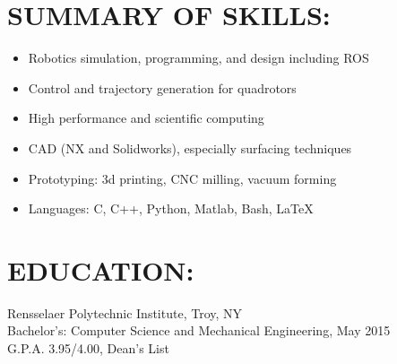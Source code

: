 \documentclass[margin]{res}
\begin{document}
  

\address{\bf Permanent\\ 3361 E. Maplewood Ave. \\   Centennial, CO 80121\\ {\bf phone: }(720) 270-3901 \\ {\bf email: }micahcorah@gmail.com}
\address{\bf Current\\ Williams 302c \\ 1999 Burdett Ave. \\   Troy, NY 12180  }

\begin{resume}                        
\vspace{-1.5mm}
\section{SUMMARY OF SKILLS:}
\vspace{10mm}
  \begin{itemize}
    \item Robotics simulation, programming, and design including ROS
    \item Control and trajectory generation for quadrotors
    \item High performance and scientific computing
    \item CAD (NX and Solidworks), especially surfacing techniques
    \item Prototyping: 3d printing, CNC milling, vacuum forming
    \item Languages: C, C++, Python, Matlab, Bash, \LaTeX
	\end{itemize}
\vspace{-3.5mm}
\section{EDUCATION:}
	Rensselaer Polytechnic Institute, Troy, NY \\
	Bachelor's: Computer Science and Mechanical Engineering, May 2015 \\
	G.P.A. 3.95/4.00, Dean's List
\vspace{-4.5mm}

\end{resume}
\end{document}
